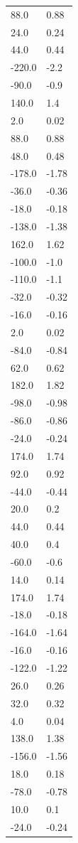 \begin{longtable}{ll}
88.0 & 0.88 \\
24.0 & 0.24 \\
44.0 & 0.44 \\
-220.0 & -2.2 \\
-90.0 & -0.9 \\
140.0 & 1.4 \\
2.0 & 0.02 \\
88.0 & 0.88 \\
48.0 & 0.48 \\
-178.0 & -1.78 \\
-36.0 & -0.36 \\
-18.0 & -0.18 \\
-138.0 & -1.38 \\
162.0 & 1.62 \\
-100.0 & -1.0 \\
-110.0 & -1.1 \\
-32.0 & -0.32 \\
-16.0 & -0.16 \\
2.0 & 0.02 \\
-84.0 & -0.84 \\
62.0 & 0.62 \\
182.0 & 1.82 \\
-98.0 & -0.98 \\
-86.0 & -0.86 \\
-24.0 & -0.24 \\
174.0 & 1.74 \\
92.0 & 0.92 \\
-44.0 & -0.44 \\
20.0 & 0.2 \\
44.0 & 0.44 \\
40.0 & 0.4 \\
-60.0 & -0.6 \\
14.0 & 0.14 \\
174.0 & 1.74 \\
-18.0 & -0.18 \\
-164.0 & -1.64 \\
-16.0 & -0.16 \\
-122.0 & -1.22 \\
26.0 & 0.26 \\
32.0 & 0.32 \\
4.0 & 0.04 \\
138.0 & 1.38 \\
-156.0 & -1.56 \\
18.0 & 0.18 \\
-78.0 & -0.78 \\
10.0 & 0.1 \\
-24.0 & -0.24 \\

\end{longtable}
